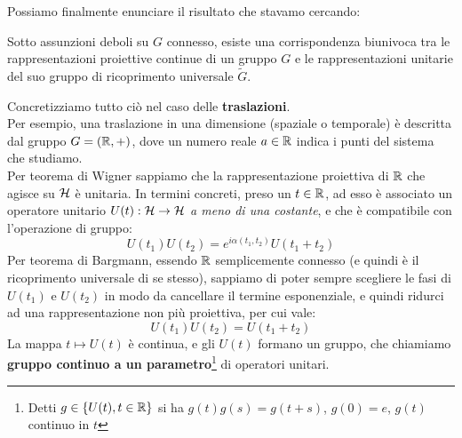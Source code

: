 \documentclass[../../FisicaTeorica.tex]{subfiles}
\begin{document}
Possiamo finalmente enunciare il risultato che stavamo cercando:
\begin{thm}
Sotto assunzioni deboli su $G$ connesso, esiste una corrispondenza biunivoca tra le rappresentazioni proiettive continue di un gruppo $G$ e le rappresentazioni unitarie del suo gruppo di ricoprimento universale $\widetilde{G}$.
\end{thm}

Concretizziamo tutto ciò nel caso delle \textbf{traslazioni}.\\
Per esempio, una traslazione in una dimensione (spaziale o temporale) è descritta dal gruppo $G=(\mathbb{R},+)$, dove un numero reale $a\in \mathbb{R}$ indica  i punti del sistema che studiamo.\\
Per teorema di Wigner sappiamo che la rappresentazione proiettiva di $\mathbb{R}$ che agisce su $\mathcal{H}$ è unitaria. In termini concreti, preso un $t\in \mathbb{R}$, ad esso è associato un operatore unitario $U(t): \mathcal{H} \to \mathcal{H}$ \textit{a meno di una costante}, e che è compatibile con l'operazione di gruppo: 
\[
U\left(t_1\right)U\left(t_2\right)=e^{i\alpha\left(t_1,t_2\right)}U\left(t_1+t_2\right)
\]
Per teorema di Bargmann, essendo $\mathbb{R}$ semplicemente connesso (e quindi è il ricoprimento universale di se stesso), sappiamo di poter sempre scegliere le fasi di $U(t_1)$ e $U(t_2)$ in modo da cancellare il termine esponenziale, e quindi ridurci ad una rappresentazione non più proiettiva, per cui vale:
\[
U(t_1)U(t_2) = U(t_1+t_2)
\]
La mappa $t \mapsto U(t)$ è continua, e gli $U(t)$ formano un gruppo, che chiamiamo \textbf{gruppo continuo a un parametro}\footnote{Detti $g\in \{U(t), t\in \mathbb{R}\}$ si ha $g(t)g(s)=g(t+s)$, $g(0)=e$, $g(t)$ continuo in $t$} di operatori unitari.\\
\end{document}
